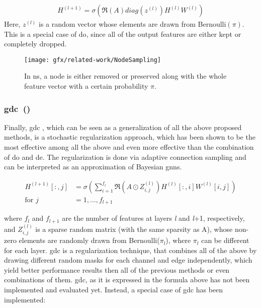 \begin{align*}
    H^{(l+1)} = \sigma (\mathfrak{R}(A) diag(z^{(l)}) H^{(l)} W^{(l)})
\end{align*}
Here, $z^{(l)}$ is a random vector whose elements are drawn from Bernoulli$(\pi)$.
This is a special case of \ac{do}, since all of the output features are either kept or
completely dropped.
\begin{figure}[ht]
    \centering
    \texttt{[image: gfx/related-work/NodeSampling]}
    \caption{In \acf{ns}, a node is either removed or preserved along with the whole feature
        vector with a certain probability $\pi$.}\label{fig:related:NodeSampling}
\end{figure}
\subsubsection{\acl*{gdc}~(\citeauthor{Hasanzadeh2020})}
\label{sec:related:pred:regularization:gdc}
Finally, \ac{gdc} \cite{Hasanzadeh2020}, which can be seen as a generalization of all the above proposed methods, is a stochastic regularization approach, which has been shown to be the most effective among all the above and even more effective than the combination of \ac{do} and \ac{de}. The regularization is done via adaptive connection sampling and can be interpreted as an approximation of Bayesian \acp{gnn}.

\begin{align*}
    H^{(l+1)}[:,j] & = \sigma \left(\sum_{i=1}^{f_{l}}\mathfrak{R}\left(A \odot Z_{i,j}^{(l)}\right)H^{(l)}[:,i]W^{(l)}[i,j]\right) \\
    \text{for } j  & = 1,..., f_{l+1}
\end{align*}

where $f_{l}$ and $f_{l+1}$ are the number of features at layers \textit{l} and \textit{l}+1, respectively, and
$Z_{i,j}^{(l)}$ is a sparse random matrix (with the same sparsity as A), whose non-zero
elements are randomly drawn from Bernoulli($\pi_{l}$), where $\pi_{l}$ can be different for each layer. \ac{gdc} is a regularization technique, that combines all of the above by drawing different random masks for each channel and edge independently, which yield better performance results then all of the previous methods or even combinations of them.
\ac{gdc}, as it is expressed in the formula above has not been implemented and evaluated yet. Instead, a special case of \ac{gdc} has been implemented:

